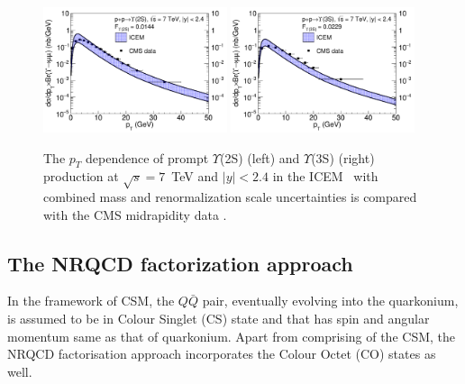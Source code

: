 \begin{figure}
\centering
\includegraphics[width=0.48\textwidth]{Figures/RV2S.pdf}
\includegraphics[width=0.48\textwidth]{Figures/RV3S.pdf}
\caption{The $p_T$ dependence of prompt $\varUpsilon$(2S) (left) and $\varUpsilon$(3S) (right)
  production at $\sqrt{s} = 7$~TeV
  and $|y|<2.4$ in the ICEM~\cite{Cheung:2018upe} with combined mass and renormalization scale uncertainties
  is compared with the CMS midrapidity data \cite{Chatrchyan:2013yna}.}
\label{CMS_2S_3S_pt}
\end{figure}








\subsection{The NRQCD factorization approach}


In the framework of CSM, the $Q\bar{Q}$ pair, eventually evolving into the quarkonium,
is assumed to be in Colour Singlet (CS) state and that has spin and 
angular momentum same as that of quarkonium.
Apart from comprising of the CSM, the NRQCD factorisation approach incorporates 
the Colour Octet (CO) states as well.

